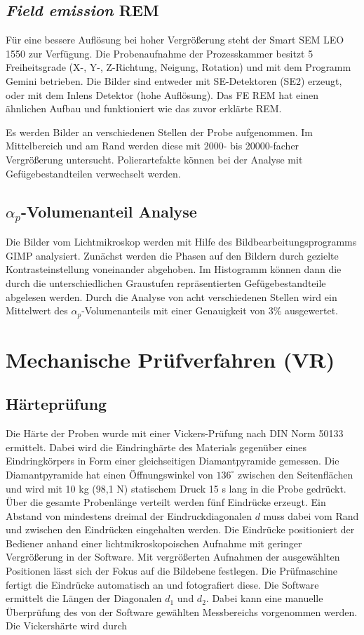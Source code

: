 \subsection*{\textit{Field emission} REM}
Für eine bessere Auflösung bei hoher Vergrößerung steht der Smart SEM LEO 1550 zur Verfügung. Die Probenaufnahme der Prozesskammer besitzt 5 Freiheitsgrade (X-, Y-, Z-Richtung, Neigung, Rotation) und mit dem Programm Gemini betrieben. Die Bilder sind entweder mit SE-Detektoren (SE2) erzeugt, oder mit dem Inlens Detektor (hohe Auflösung). Das FE REM hat einen ähnlichen Aufbau und funktioniert wie das zuvor erklärte REM.

Es werden Bilder an verschiedenen Stellen der Probe aufgenommen. Im Mittelbereich und am Rand werden diese mit 2000- bis 20000-facher Vergrößerung untersucht. Polierartefakte können bei der Analyse mit Gefügebestandteilen verwechselt werden. 

\subsection*{$\alpha_{p}$-Volumenanteil Analyse}

Die Bilder vom Lichtmikroskop werden mit Hilfe des Bildbearbeitungsprogramms GIMP analysiert. Zunächst werden die Phasen auf den Bildern durch gezielte Kontrasteinstellung voneinander abgehoben. Im Histogramm können dann die durch die unterschiedlichen Graustufen repräsentierten Gefügebestandteile abgelesen werden. Durch die Analyse von acht verschiedenen Stellen wird ein Mittelwert des $\alpha_{p}$-Volumenanteils mit einer Genauigkeit von 3\% ausgewertet.


\section{Mechanische Prüfverfahren (VR)}

\subsection*{Härteprüfung}

Die Härte der Proben wurde mit einer Vickers-Prüfung nach DIN Norm 50133 ermittelt. Dabei wird die Eindringhärte des Materials gegenüber eines Eindringkörpers in Form einer gleichseitigen Diamantpyramide gemessen. Die Diamantpyramide hat einen Öffnungswinkel von $136^\circ$ zwischen den Seitenflächen und wird mit 10 kg (98,1 N) statischem Druck 15 s lang in die Probe gedrückt. Über die gesamte Probenlänge verteilt werden fünf Eindrücke erzeugt. Ein Abstand von mindestens dreimal der Eindruckdiagonalen $d$ muss dabei vom Rand und zwischen den Eindrücken eingehalten werden.
Die Eindrücke positioniert der Bediener anhand einer lichtmikroskopoischen Aufnahme mit geringer Vergrößerung in der Software. Mit vergrößerten Aufnahmen der ausgewählten Positionen lässt sich der Fokus auf die Bildebene festlegen. Die Prüfmaschine fertigt die Eindrücke automatisch an und fotografiert diese. Die Software ermittelt die Längen der Diagonalen $d_1$ und $d_2$. Dabei kann eine manuelle Überprüfung des von der Software gewählten Messbereichs vorgenommen werden. Die Vickershärte wird durch

